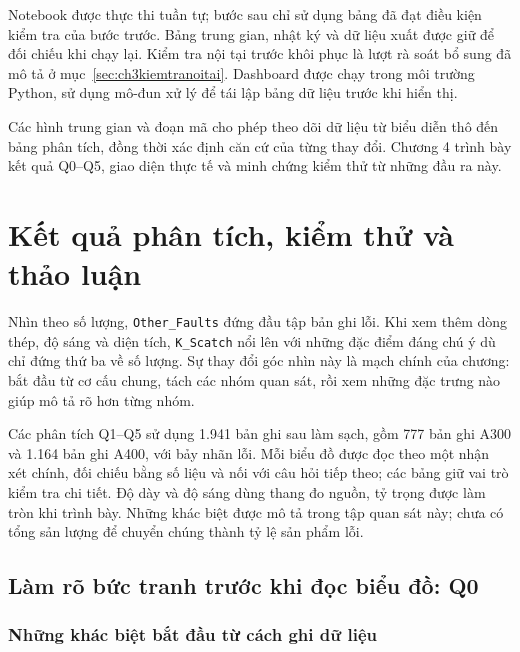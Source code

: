 \documentclass[12pt,a4paper,oneside]{report}
\newcommand{\maCot}[1]{{\urlstyle{tt}\def\UrlBreaks{\do\_\do\/\do\.}\def\UrlBigBreaks{}\nolinkurl{#1}}}
\begin{document}
Notebook được thực thi tuần tự; bước sau chỉ sử dụng bảng đã đạt điều kiện kiểm tra của bước trước. Bảng trung gian, nhật ký và dữ liệu xuất được giữ để đối chiếu khi chạy lại. Kiểm tra nội tại trước khôi phục là lượt rà soát bổ sung đã mô tả ở mục~\ref{sec:ch3kiemtranoitai}. Dashboard được chạy trong môi trường Python, sử dụng mô-đun xử lý để tái lập bảng dữ liệu trước khi hiển thị.

Các hình trung gian và đoạn mã cho phép theo dõi dữ liệu từ biểu diễn thô đến bảng phân tích, đồng thời xác định căn cứ của từng thay đổi. Chương 4 trình bày kết quả Q0--Q5, giao diện thực tế và minh chứng kiểm thử từ những đầu ra này.
\chapter{Kết quả phân tích, kiểm thử và thảo luận}
\label{chap:ketqua}

\newcommand{\ghiChuHinh}[1]{\fbox{\parbox{0.90\linewidth}{\small\setstretch{1.1}\textbf{Vị trí chèn hình.} #1}}}

Nhìn theo số lượng, \maCot{Other_Faults} đứng đầu tập bản ghi lỗi. Khi xem thêm dòng thép, độ sáng và diện tích, \maCot{K_Scatch} nổi lên với những đặc điểm đáng chú ý dù chỉ đứng thứ ba về số lượng. Sự thay đổi góc nhìn này là mạch chính của chương: bắt đầu từ cơ cấu chung, tách các nhóm quan sát, rồi xem những đặc trưng nào giúp mô tả rõ hơn từng nhóm.

Các phân tích Q1--Q5 sử dụng 1.941 bản ghi sau làm sạch, gồm 777 bản ghi A300 và 1.164 bản ghi A400, với bảy nhãn lỗi. Mỗi biểu đồ được đọc theo một nhận xét chính, đối chiếu bằng số liệu và nối với câu hỏi tiếp theo; các bảng giữ vai trò kiểm tra chi tiết. Độ dày và độ sáng dùng thang đo nguồn, tỷ trọng được làm tròn khi trình bày. Những khác biệt được mô tả trong tập quan sát này; chưa có tổng sản lượng để chuyển chúng thành tỷ lệ sản phẩm lỗi.

\section{Làm rõ bức tranh trước khi đọc biểu đồ: Q0}
\label{sec:ch4q0}

\subsection{Những khác biệt bắt đầu từ cách ghi dữ liệu}
\end{document}
